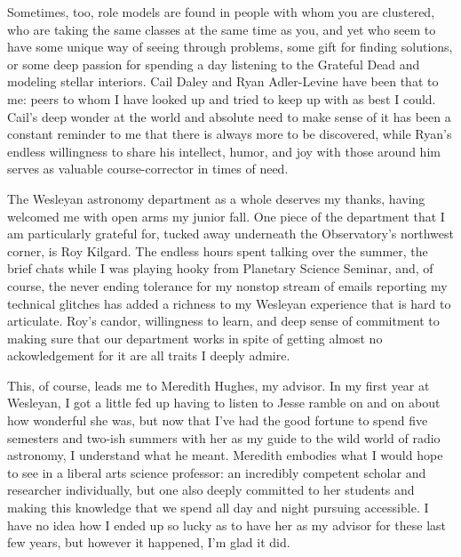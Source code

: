 Sometimes, too, role models are found in people with whom you are clustered, who are taking the same classes at the same time as you, and yet who seem to have some unique way of seeing through problems, some gift for finding solutions, or some deep passion for spending a day listening to the Grateful Dead and modeling stellar interiors. Cail Daley and Ryan Adler-Levine have been that to me: peers to whom I have looked up and tried to keep up with as best I could. Cail's deep wonder at the world and absolute need to make sense of it has been a constant reminder to me that there is always more to be discovered, while Ryan's endless willingness to share his intellect, humor, and joy with those around him serves as valuable course-corrector in times of need.



The Wesleyan astronomy department as a whole deserves my thanks, having welcomed me with open arms my junior fall. One piece of the department that I am particularly grateful for, tucked away underneath the Observatory's northwest corner, is Roy Kilgard. The endless hours spent talking over the summer, the brief chats while I was playing hooky from Planetary Science Seminar, and, of course, the never ending tolerance for my nonstop stream of emails reporting my technical glitches has added a richness to my Wesleyan experience that is hard to articulate. Roy's candor, willingness to learn, and deep sense of commitment to making sure that our department works in spite of getting almost no ackowledgement for it are all traits I deeply admire.


This, of course, leads me to Meredith Hughes, my advisor. In my first year at Wesleyan, I got a little fed up having to listen to Jesse ramble on and on about how wonderful she was, but now that I've had the good fortune to spend five semesters and two-ish summers with her as my guide to the wild world of radio astronomy, I understand what he meant. Meredith embodies what I would hope to see in a liberal arts science professor: an incredibly competent scholar and researcher individually, but one also deeply committed to her students and making this knowledge that we spend all day and night pursuing accessible. I have no idea how I ended up so lucky as to have her as my advisor for these last few years, but however it happened, I'm glad it did.


